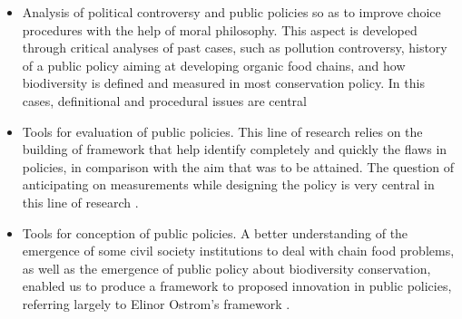\begin{itemize}
\item Analysis of political controversy and public policies so as to improve choice procedures with the help of moral philosophy. This aspect is developed through critical analyses of past cases, such as pollution controversy, history of a public policy aiming at developing organic food chains, and how biodiversity is defined and measured in most conservation policy. In this cases, definitional and procedural issues are central \cite{Mundler2016Alimentation-1034595, Meinard2017La-1132055, Rouchier2016Learning-1034611, Meinard2017Measuring-1132041}
\item Tools for evaluation of public policies. This line of research relies on the building of framework that help identify completely and quickly the flaws in policies, in comparison with the aim that was to be attained. The question of anticipating on measurements while designing the policy is very central in this line of research  \cite{Tsoukias2015Rural-1223037,Kana-Zeumo2014A-619377,Giordano2017Drinking-1250556}. 
\item Tools for conception of public policies. A better understanding of the emergence of some civil society institutions to deal with chain food problems, as well as the emergence of public policy about biodiversity conservation, enabled us to produce a framework to proposed innovation in public policies, referring largely to Elinor Ostrom's framework   \cite{DeMarchi2016From-617095,Meinard2016The-1052633, Lamine2016D-1204722}. 
\end{itemize}



%

